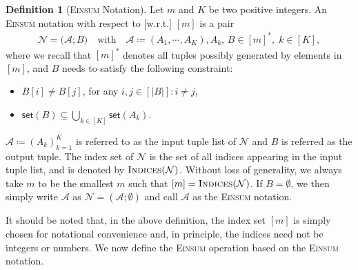 \documentclass[sn-mathphys, natbib=false]{sn-jnl}
\theoremstyle{plain}
\theoremstyle{definition}
\newtheorem{definition}{Definition}
\def\Einsum{\textsc{Einsum}}
\newcommand{\takesetp}[1]{\mathsf{set}(#1)}
\newcommand{\indexset}{\textsc{Indices}}
\def\calA{\mathcal{A}}
\def\calN{\mathcal{N}}
\begin{document}
\begin{bibunit}[agsm]
\begin{definition}[\Einsum{} Notation]\label{def:tensor_expression}
Let $m$ and $K$ be two positive integers. An \Einsum{} notation with respect to [w.r.t.] $[m]$ is a pair
\begin{align*}
\calN = \big(\calA; B\big) \quad \text{with} \quad \calA \coloneqq (A_1, \cdots, A_K), A_k,\, B \in [m]^*, \; k \in [K],
\end{align*}
where we recall that $[m]^{\ast}$ denotes all tuples possibly generated by elements in $[m]$, and $B$ needs to satisfy the following constraint: 

\begin{itemize}
    \item $B[i] \neq B[j]$, for any $i, j \in [|B|]:i \neq j$, 
    \item $\takesetp{B} \subseteq \bigcup_{k \in [K]} \takesetp{A_k}$.
\end{itemize}
$\calA \coloneqq (A_k)_{k = 1}^{K}$ is referred to as the input tuple list of $\calN$ and $B$ is referred as the output tuple. The index set of $\calN$ is the set of all indices appearing in the input tuple list, and is denoted by $\indexset(\calN)$. Without loss of generality, we always take $m$ to be the smallest $m$ such that $[m] = \indexset(\calN)$. If $B = \emptyset$, we then simply write $\calA$ as $\calN = (\calA; \emptyset)$ and call $\calA$ as the \Einsum{} notation.
\end{definition}


It should be noted that, in the above definition, the index set $[m]$ is simply chosen for notational convenience and, in principle, the indices need not be integers or numbers. We now define the \Einsum{} operation based on the \Einsum{} notation.


\end{bibunit}
\end{document}
